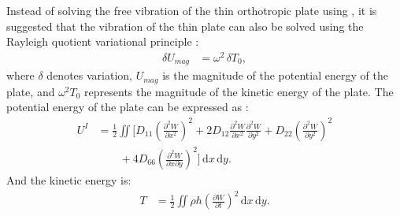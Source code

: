 \documentclass[preprint,12pt]{elsarticle}
\begin{document}
Instead of solving the free vibration of the thin orthotropic plate using , it is suggested that the vibration of the thin plate can also be solved using the Rayleigh quotient variational principle \cite{xing2018overall}:
%
\begin{equation}\label{eq:Rayleigh}
	\begin{split}
		\delta U_{mag} &= \omega^2\,\delta T_0,
	\end{split}
\end{equation}
%
where \(\delta\) denotes variation, \(U_{mag}\) is the magnitude of the potential energy of the plate, and \(\omega^2 T_0\) represents the magnitude of the kinetic energy of the plate.
The potential energy of the plate can be expressed as \cite{xing2020extended}:
%
\begin{equation}\label{eq:poten_energy}
	\begin{split}
		U^{I} &= \frac{1}{2}\iint \Big[D_{11}\left(\frac{\partial^2 W}{\partial x^2}\right)^2 + 2D_{12}\frac{\partial^2 W}{\partial x^2}\frac{\partial^2 W}{\partial y^2} + D_{22}\left(\frac{\partial^2 W}{\partial y^2}\right)^2 \\
		&\qquad + 4D_{66}\left(\frac{\partial^2 W}{\partial x \partial y}\right)^2\Big] \, \mathrm{d}x \, \mathrm{d}y.
	\end{split}
\end{equation}
%
And the kinetic energy is:
%
\begin{equation}\label{eq:kine_energy}
	\begin{split}
		T &= \frac{1}{2}\iint \rho h \left(\frac{\partial W}{\partial t}\right)^2 \, \mathrm{d}x \, \mathrm{d}y.
	\end{split}
\end{equation}
\end{document}

